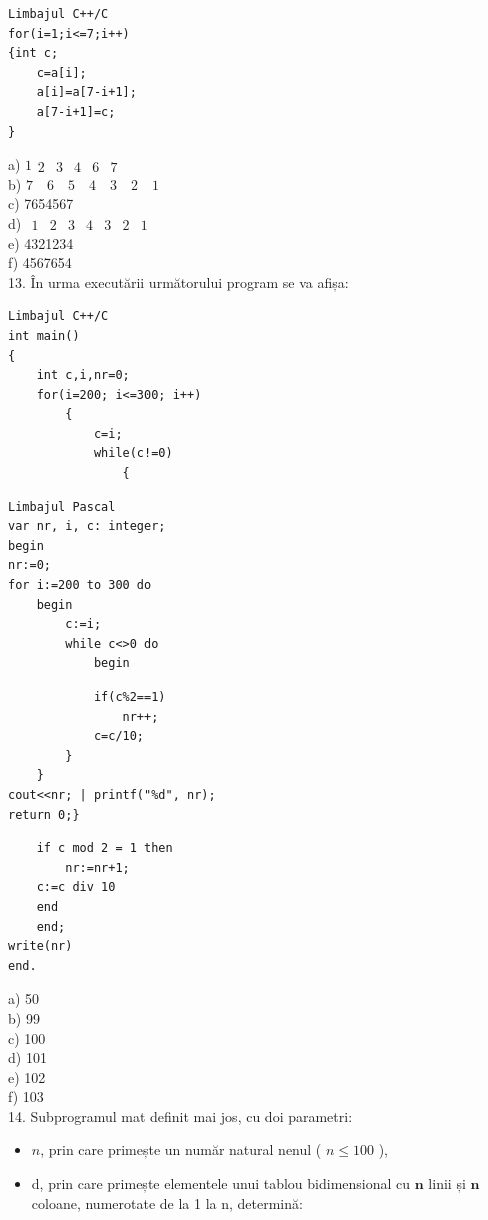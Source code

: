\documentclass[10pt]{article}
\begin{document}
\begin{verbatim}
Limbajul C++/C
for(i=1;i<=7;i++)
{int c;
    c=a[i];
    a[i]=a[7-i+1];
    a[7-i+1]=c;
}
\end{verbatim}

a) $1 \begin{array}{llllll}2 & 3 & 4 & 6 & 7\end{array}$\\
b) $7 \quad 6 \quad 5 \quad 4 \quad 3 \quad 2 \quad 1$\\
c) 7654567\\
d) $\begin{array}{lllllll}1 & 2 & 3 & 4 & 3 & 2 & 1\end{array}$\\
e) 4321234\\
f) 4567654\\
13. În urma executării următorului program se va afișa:

\begin{verbatim}
Limbajul C++/C
int main()
{
    int c,i,nr=0;
    for(i=200; i<=300; i++)
        {
            c=i;
            while(c!=0)
                {
\end{verbatim}

\begin{verbatim}
Limbajul Pascal
var nr, i, c: integer;
begin
nr:=0;
for i:=200 to 300 do
    begin
        c:=i;
        while c<>0 do
            begin
\end{verbatim}

\begin{verbatim}
            if(c%2==1)
                nr++;
            c=c/10;
        }
    }
cout<<nr; | printf("%d", nr);
return 0;}
\end{verbatim}

\begin{verbatim}
    if c mod 2 = 1 then
        nr:=nr+1;
    c:=c div 10
    end
    end;
write(nr)
end.
\end{verbatim}

a) 50\\
b) 99\\
c) 100\\
d) 101\\
e) 102\\
f) 103\\
14. Subprogramul mat definit mai jos, cu doi parametri:

\begin{itemize}
  \item $n$, prin care primește un număr natural nenul ( $n \leq 100$ ),
  \item d, prin care primește elementele unui tablou bidimensional cu $\mathbf{n}$ linii și $\mathbf{n}$ coloane, numerotate de la 1 la n, determină:
\end{itemize}
\end{document}
